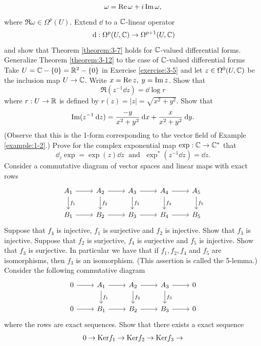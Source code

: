 \begin{enumerate}[\theexercise.1]
    \[
      \omega  = \operatorname{Re}\omega  + i\operatorname{Im}\omega,
    \]
    where $\Re\omega  \in  {\Omega }^{p}( U)$. Extend $\dd$ to a $\mathbb{C}$-linear operator
    \[
      \dd: {\Omega }^{p}( {U,\B{C}})  \ra  {\Omega }^{p + 1}( {U,\B{C}})
    \]
    and show that Theorem \ref{theorem:3-7} holds for $\mathbb{C}$-valued differential forms. Generalize Theorem \ref{theorem:3-12} to the case of $\mathbb{C}$-valued differential forms
  \NewItem Take $U = \mathbb{C}- \{ 0\}  = {\mathbb{R}}^{2}- \{ 0\}$ in Exercise \ref{exercise:3-5} and let $z \in  {\Omega }^{0}( {U,\mathbb{C}})$ be the inclusion map $U \rightarrow  \mathbb{C}$. Write $x = \operatorname{Re} z,\; y = \operatorname{Im} z$. Show that
    \[
      \Re( {{z}^{-1}{\dd z}})  = \dd \log r
    \]
    where $r : U \rightarrow  {\ensuremath{\mathbb{R}}}$ is defined by $r( z)  = \left| z\right|  = \sqrt{{x}^{2} + {y}^{2}}$. Show that
    \[
      \im( {{z}^{-1}{\dd z}})  = \frac{-y}{{x}^{2} + {y}^{2}}{\dd x} + \frac{x}{{x}^{2} + {y}^{2}}{\dd y}.
    \]
    (Observe that this is the 1-form corresponding to the vector field of Example \ref{example:1-2}.)
  \NewItem Prove for the complex exponential map $\exp  : \mathbb{C} \rightarrow  {\ensuremath{\mathbb{C}}}^*$ that
    \[
      {\dd }_{z}\exp  = \exp ( z) {\dd z}\;\text{ and }\;{\exp }^*( {{z}^{-1}{\dd z}})  = {\dd z}.
    \]
  \newchap[4]
  \NewItem Consider a commutative diagram of vector spaces and linear maps with exact rows
    \[\begin{tikzcd}
        A_1\dar{f_1}\rar{} & A_2\dar{f_2}\rar{} & A_3\dar{f_3}\rar{} & A_4\dar{f_4}\rar{} & A_5\dar{f_5} \\
        B_1\rar{} & B_2\rar{} & B_3\rar{} & B_4\rar{} & B_5
      \end{tikzcd}\]
    Suppose that $f_4$ is injective, $f_1$ is surjective and $f_2$ is injective. Show that
    $f_3$ is injective. Suppose that $f_2$ is surjective, $f_4$ is surjective and $f_5$ is
    injective. Show that $f_3$ is surjective. In particular we have that if $f_1, f_2, f_4$
    and $f_5$ are isomorphisms, then $f_3$ is an isomorphism. (This assertion is called the 5-lemma.)
  \NewItem Consider the following commutative diagram
    \[\begin{tikzcd}
      0\rar{} & A_1\rar{}\dar{f_1} & A_2\rar{}\dar{f_2} & A_3\rar{}\dar{f_3} & 0 \\
      0\rar{} & B_1\rar{} & B_2\rar{} & B_3\rar{} & 0
    \end{tikzcd}\]
    where the rows are exact sequences. Show that there exists a exact sequence
    \begin{align*}
      0 & \ra {\ker}{f}_{1} \ra {\ker}{f}_{2} \ra {\ker}{f}_{3} \ra \\

\end{align*}
\end{enumerate}
